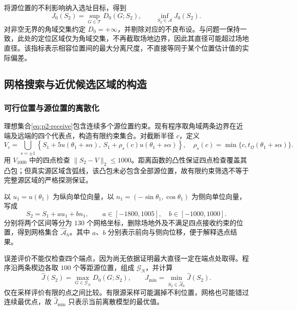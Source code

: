 将源位置的不利影响纳入选址目标，得到
\begin{equation}\label{eq:p2-minmax}
J_0(S_2)=\sup_{G\in\mathcal T}D_0(G;S_2),\qquad
\inf_{S_2\in\mathcal A}J_0(S_2).
\end{equation}
对非空无界的角域交集约定 $D_0=+\infty$，并剔除对应的不良布设。与问题一保持一致，此处的定位区域仅为角域交集，不再截取场地边界，因此其直径可能超过场地直径。该指标表示相容位置间的最大分离尺度，不直接等同于某个位置估计值的实际偏差。

\pTwoPageBreak
\subsection{网格搜索与近优候选区域的构造}

\subsubsection{可行位置与源位置的离散化}

理想集合\eqref{eq:p2-receive}包含连续多个源位置约束。现有程序取角域两条边界在近端及远端的四个代表点，构造有限约束集合。对截断半径 $c$，定义
\begin{equation}\label{eq:p2-four}
V_c=\bigcup_{s=\pm1}\left\{S_1+5u(\theta_1+s\alpha),\ 
S_1+\rho_s(c)u(\theta_1+s\alpha)\right\},\quad
\rho_s(c)=\min\{c,t_\Omega(\theta_1+s\alpha)\}.
\end{equation}
用 $V_{1000}$ 中的四点检查 $\|S_2-V\|_2\le1000$。距离函数的凸性保证四点检查覆盖其凸包；但真实源区域含弧线，该凸包未必包含全部源位置，故有限约束筛选不等于完整源区域的严格探测保证。

以 $u_1=u(\theta_1)$ 为纵向单位向量，以 $n_1=(-\sin\theta_1,\cos\theta_1)$ 为侧向单位向量，写成
\begin{equation}\label{eq:p2-grid}
S_2=S_1+a u_1+b n_1,\qquad
a\in[-1800,1005],\quad b\in[-1000,1000].
\end{equation}
分别将两个区间等分为 $130$ 个网格坐标，删除场地外及不满足四点接收约束的位置，得到网格集合 $\widehat{\mathcal A}_h$。其中 $a$、$b$ 分别表示前向与侧向位移，便于解释选点结果。

误差评价不能仅检查四个端点，因为尚无依据证明最大直径一定在端点处取得。程序沿两条楔边各取 $100$ 个等距源位置，组成 $\mathcal G_N$，并计算
\begin{equation}\label{eq:p2-sampled}
\widehat J(S_2)=\max_{G\in\mathcal G_N}D_0(G;S_2),\qquad
\widehat J_{\min}=\min_{S_2\in\widehat{\mathcal A}_h}\widehat J(S_2).
\end{equation}
仅在采样评价有限的点之间比较。有限源采样可能漏掉不利位置，网格也可能错过连续最优点，故 $\widehat J_{\min}$ 只表示当前离散模型的最优值。

